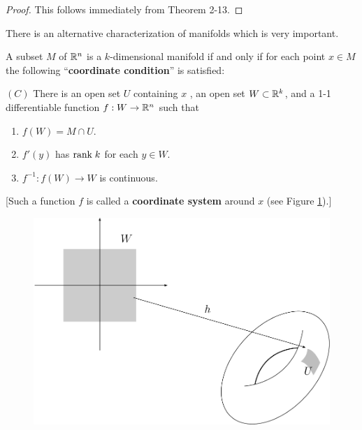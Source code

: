 \begin{proof}
    This follows immediately from Theorem 2-13. 
\end{proof}

There is an alternative characterization of manifolds which
is very important.

\begin{theorem}
    A subset $M$ of $\mathbb{R}^n$ is a $k$-dimensional manifold if and only if for 
    each point $x\in M$ the following ``\textbf{coordinate condition}'' is satisfied:
    
    \vspace*{1em}
    \noindent$(C)$ There is an open set $U$ containing $x$ , an open set $W\subset\mathbb{R}^k$,
    and a 1-1 differentiable function $f:W\to\mathbb{R}^n$ such that
    \begin{enumerate}[label=\upshape{(\arabic*)}]
        \item $f(W)=M\cap U$.
        \item $f'(y)$ has $\mathrm{rank}\; k$ for each $y\in W$.
        \item $f^{-1}:f(W)\to W$ is continuous.
    \end{enumerate}
\end{theorem}

[Such a function $f$ is called a \textbf{coordinate system} around $x$ (see Figure \ref{Fig 5-2}).]

\begin{figure}[!htb]
    \centering
    \includegraphics[width=.75\linewidth]{./pics/Fig5-2.pdf}
    \caption{}
    \label{Fig 5-2}
\end{figure}

